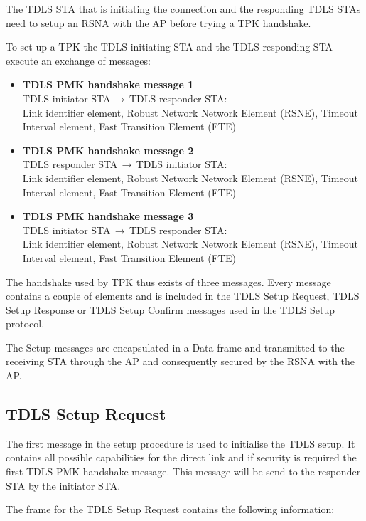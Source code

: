The TDLS STA that is initiating the connection and the responding TDLS STAs need to setup an RSNA with the AP before trying a TPK handshake. 

To set up a TPK the TDLS initiating STA and the TDLS responding STA execute an exchange of messages:

\begin{itemize}
	\item[] \textbf{TDLS PMK handshake message 1}\\ TDLS initiator STA$\,\to\,$TDLS responder STA:\\
	Link identifier element, Robust Network Network Element (RSNE), Timeout Interval element, Fast Transition Element (FTE)
	\item[] \textbf{TDLS PMK handshake message 2}\\ TDLS responder STA$\,\to\,$TDLS initiator STA:\\
	Link identifier element, Robust Network Network Element (RSNE), Timeout Interval element, Fast Transition Element (FTE)
	\item[] \textbf{TDLS PMK handshake message 3}\\ TDLS initiator STA$\,\to\,$TDLS responder STA:\\
	Link identifier element, Robust Network Network Element (RSNE), Timeout Interval element, Fast Transition Element (FTE)
\end{itemize}

The handshake used by TPK thus exists of three messages. Every message contains a couple of elements and is included in the TDLS Setup Request, TDLS Setup Response or TDLS Setup Confirm messages used in the TDLS Setup protocol.

The Setup messages are encapsulated in a Data frame and transmitted to the receiving STA through the AP and consequently secured by the RSNA with the AP.

\subsection{TDLS Setup Request}

The first message in the setup procedure is used to initialise the TDLS setup. It contains all possible capabilities for the direct link and if security is required the first TDLS PMK handshake message.  This message will be send to the responder STA by the initiator STA.

The frame for the TDLS Setup Request contains the following information:

